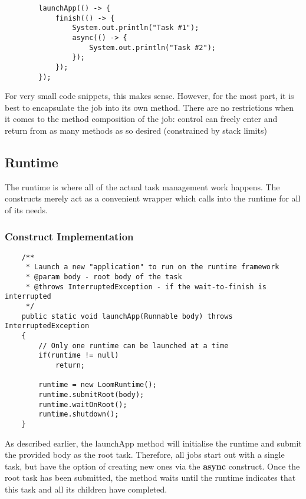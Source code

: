 \documentclass[12pt]{article}
\begin{document}
    \begin{lstlisting}
        launchApp(() -> {
            finish(() -> {
                System.out.println("Task #1");
                async(() -> {
                    System.out.println("Task #2");
                });
            });
        });
    \end{lstlisting}

    For very small code snippets, this makes sense. However, for the most part, it is best to encapsulate the
    job into its own method. There are no restrictions when it comes to the method composition of the job:
    control can freely enter and return from as many methods as so desired (constrained by stack limits)

    \subsection{Runtime}

    The runtime is where all of the actual task management work happens. The constructs merely act as a
    convenient wrapper which calls into the runtime for all of its needs. 

    \subsubsection{Construct Implementation}

    \begin{lstlisting}
    /**
     * Launch a new "application" to run on the runtime framework
     * @param body - root body of the task
     * @throws InterruptedException - if the wait-to-finish is interrupted
     */
    public static void launchApp(Runnable body) throws InterruptedException
    {
        // Only one runtime can be launched at a time
        if(runtime != null)
            return;

        runtime = new LoomRuntime();
        runtime.submitRoot(body);
        runtime.waitOnRoot();
        runtime.shutdown();
    }
    \end{lstlisting}

    As described earlier, the launchApp method will initialise the runtime and submit the provided body as
    the root task. Therefore, all jobs start out with a single task, but have the option of creating new ones
    via the \textbf{async} construct. Once the root task has been submitted, the method waits until the
    runtime indicates that this task and all its children have completed.
\end{document}
